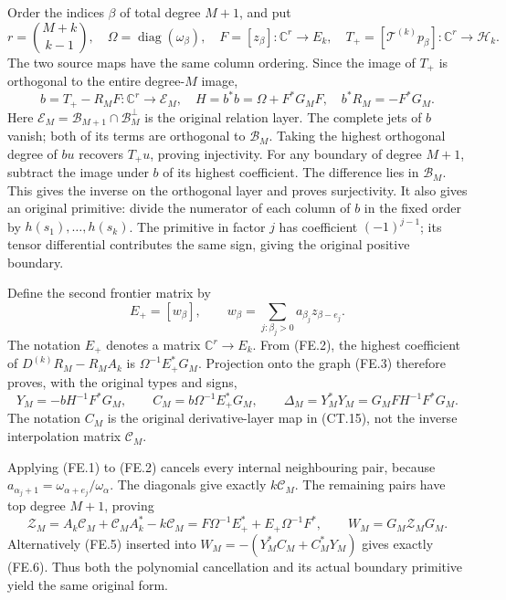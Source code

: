 Order the indices \(\beta\) of total degree \(M+1\), and put
\[
 r=\binom{M+k}{k-1},\quad
 \Omega=\operatorname{diag}(\omega_\beta),\quad
 F=[z_\beta]:\mathbb C^r\to E_k,
 \quad T_+=[\mathcal T^{(k)}p_\beta]:\mathbb C^r\to\mathcal H_k.
\]
The two source maps have the same column ordering.  Since the image
of \(T_+\) is orthogonal to the entire degree-\(M\) image,
\[
 b=T_+-R_MF:\mathbb C^r\longrightarrow\mathcal E_M,
 \quad H=b^*b=\Omega+F^*G_MF,\quad b^*R_M=-F^*G_M.
 \tag{FE.3}
\]
Here \(\mathcal E_M=\mathcal B_{M+1}\cap\mathcal B_M^\perp\)
is the original relation layer.  The complete jets of \(b\)
vanish; both of its terms are orthogonal to \(\mathcal B_M\).
Taking the highest orthogonal degree of \(bu\) recovers
\(T_+u\), proving injectivity.  For any boundary of degree
\(M+1\), subtract the image under \(b\) of its highest
coefficient.  The difference lies in \(\mathcal B_M\).
This gives the inverse on the orthogonal layer and proves surjectivity.
It also gives an original primitive: divide the numerator of each
column of \(b\) in the fixed order by
\(h(s_1),\ldots,h(s_k)\).  The primitive in factor \(j\)
has coefficient \((-1)^{j-1}\); its tensor differential contributes
the same sign, giving the original positive boundary.

Define the second frontier matrix by
\[
 E_+=[w_\beta],\qquad
 w_\beta=\sum_{j:\beta_j>0}a_{\beta_j}z_{\beta-e_j}.
 \tag{FE.4}
\]
The notation \(E_+\) denotes a matrix \(\mathbb C^r\to E_k\).
From (FE.2), the highest coefficient of
\(D^{(k)}R_M-R_MA_k\) is
\(\Omega^{-1}E_+^*G_M\).  Projection onto the graph (FE.3)
therefore proves, with the original types and signs,
\[
 Y_M=-bH^{-1}F^*G_M,\qquad
 C_M=b\Omega^{-1}E_+^*G_M,\qquad
 \Delta_M=Y_M^*Y_M=G_MF H^{-1}F^*G_M.                   \tag{FE.5}
\]
The notation \(C_M\) is the original derivative-layer map in
(CT.15), not the inverse interpolation matrix \(\mathcal C_M\).

Applying (FE.1) to (FE.2) cancels every internal neighbouring pair,
because \(a_{\alpha_j+1}=\omega_{\alpha+e_j}/\omega_\alpha\).
The diagonals give exactly \(k\mathcal C_M\).  The remaining
pairs have top degree \(M+1\), proving
\[
 \mathcal Z_M=A_k\mathcal C_M+\mathcal C_MA_k^*-k\mathcal C_M
     =F\Omega^{-1}E_+^*+E_+\Omega^{-1}F^*,\qquad
 W_M=G_M\mathcal Z_MG_M.                                \tag{FE.6}
\]
Alternatively (FE.5) inserted into
\(W_M=-(Y_M^*C_M+C_M^*Y_M)\) gives exactly (FE.6).
Thus both the polynomial cancellation and its actual boundary
primitive yield the same original form.

